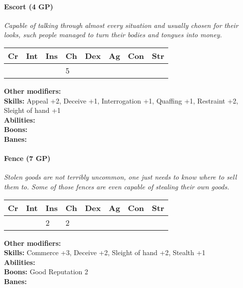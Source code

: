 \paragraph*{Escort (4 GP)}
\textit{Capable of talking through almost every situation and usually chosen for their looks, such people managed to turn their bodies and tongues into money.}\par
\begin{tabular}{|l|l|l|l|l|l|l|l|}
	\hline
	Cr & Int & Ins & Ch & Dex & Ag & Con & Str \\ \hline
	&  &  & 5 &  &  &  &  \\ \hline
\end{tabular}\par
\noindent\textbf{Other modifiers:} \\
\textbf{Skills:} Appeal +2,
Deceive +1,
Interrogation +1,
Quaffing +1,
Restraint +2,
Sleight of hand +1\\
\textbf{Abilities:} \\
\textbf{Boons:} \\
\textbf{Banes:} \\

\hrulefill
\paragraph*{Fence (7 GP)}
\textit{Stolen goods are not terribly uncommon, one just needs to know where to sell them to. Some of those fences are even capable of stealing their own goods.}\par
\begin{tabular}{|l|l|l|l|l|l|l|l|}
	\hline
	Cr & Int & Ins & Ch & Dex & Ag & Con & Str \\ \hline
	&  & 2 & 2 &  &  &  &  \\ \hline
\end{tabular}\par
\noindent\textbf{Other modifiers:} \\
\textbf{Skills:} Commerce +3,
Deceive +2,
Sleight of hand +2,
Stealth +1\\
\textbf{Abilities:} \\
\textbf{Boons:} Good Reputation 2\\
\textbf{Banes:} \\

\hrulefill
